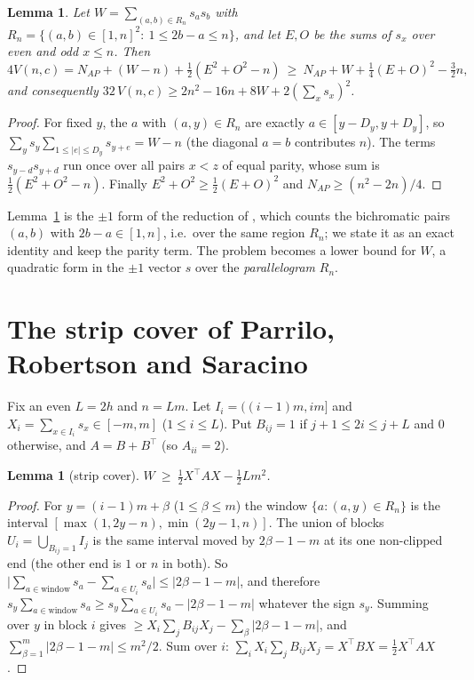 \documentclass[11pt]{amsart}
\newtheorem{lemma}[theorem]{Lemma}
\theoremstyle{remark}
\newcommand{\mono}{V}
\begin{document}
\begin{lemma}\label{lem:ident}
Let $W=\sum_{(a,b)\in R_n}s_as_b$ with $R_n=\{(a,b)\in[1,n]^2:\ 1\le2b-a\le n\}$, and let $E,O$ be the sums of $s_x$ over even and odd $x\le n$.
Then
\[4\mono(n,c)=N_{AP}+(W-n)+\tfrac12(E^2+O^2-n)\ \ge\ N_{AP}+W+\tfrac14(E+O)^2-\tfrac32n,\]
and consequently $32\,\mono(n,c)\ge2n^2-16n+8W+2(\sum_xs_x)^2$.
\end{lemma}
\begin{proof}
For fixed $y$, the $a$ with $(a,y)\in R_n$ are exactly $a\in[y-D_y,y+D_y]$, so $\sum_ys_y\sum_{1\le|e|\le D_y}s_{y+e}=W-n$ (the diagonal $a=b$ contributes $n$).
The terms $s_{y-d}s_{y+d}$ run once over all pairs $x<z$ of equal parity, whose sum is $\tfrac12(E^2+O^2-n)$. Finally $E^2+O^2\ge\frac12(E+O)^2$ and
$N_{AP}\ge(n^2-2n)/4$.
\end{proof}
Lemma~\ref{lem:ident} is the $\pm1$ form of the reduction of \cite[Sec.~2, Lemma~1]{PRS08}, which counts the bichromatic pairs $(a,b)$ with $2b-a\in[1,n]$, i.e.\ over the same region $R_n$; we state it as an exact identity and keep the parity term. The problem becomes a lower bound for $W$, a quadratic form
in the $\pm1$ vector $s$ over the \emph{parallelogram} $R_n$.

\section{The strip cover of Parrilo, Robertson and Saracino}\label{sec:prs}
Fix an even $L=2h$ and $n=Lm$. Let $I_i=((i-1)m,im]$ and $X_i=\sum_{x\in I_i}s_x\in[-m,m]$ ($1\le i\le L$). Put $B_{ij}=1$ if $j+1\le2i\le j+L$ and $0$ otherwise,
and $A=B+B^{\top}$ (so $A_{ii}=2$).

\begin{lemma}[strip cover]\label{lem:strip}
$W\ \ge\ \tfrac12X^{\top}AX-\tfrac12Lm^2$.
\end{lemma}
\begin{proof}
For $y=(i-1)m+\beta$ ($1\le\beta\le m$) the window $\{a:(a,y)\in R_n\}$ is the interval $[\max(1,2y-n),\min(2y-1,n)]$. The union of blocks $U_i=\bigcup_{B_{ij}=1}I_j$ is the
same interval moved by $2\beta-1-m$ at its one non-clipped end (the other end is $1$ or $n$ in both). So $\bigl|\sum_{a\in\text{window}}s_a-\sum_{a\in U_i}s_a\bigr|\le|2\beta-1-m|$, and therefore $s_y\sum_{a\in\text{window}}s_a\ge s_y\sum_{a\in U_i}s_a-|2\beta-1-m|$ whatever the sign $s_y$.
Summing over $y$ in block $i$ gives $\ge X_i\sum_jB_{ij}X_j-\sum_\beta|2\beta-1-m|$, and $\sum_{\beta=1}^m|2\beta-1-m|\le m^2/2$. Sum over $i$:
$\sum_iX_i\sum_jB_{ij}X_j=X^{\top}BX=\frac12X^{\top}AX$.
\end{proof}
\end{document}
